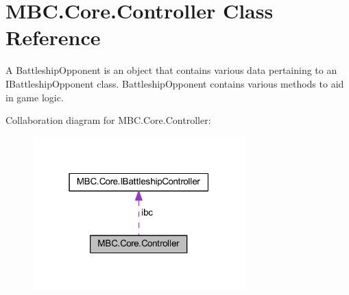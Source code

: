 \hypertarget{class_m_b_c_1_1_core_1_1_controller}{\section{M\-B\-C.\-Core.\-Controller Class Reference}
\label{class_m_b_c_1_1_core_1_1_controller}
}


A Battleship\-Opponent is an object that contains various data pertaining to an I\-Battleship\-Opponent class. Battleship\-Opponent contains various methods to aid in game logic. 




Collaboration diagram for M\-B\-C.\-Core.\-Controller\-:
\nopagebreak
\begin{figure}[H]
\begin{center}
\leavevmode
\includegraphics[width=232pt]{class_m_b_c_1_1_core_1_1_controller__coll__graph}
\end{center}
\end{figure}
